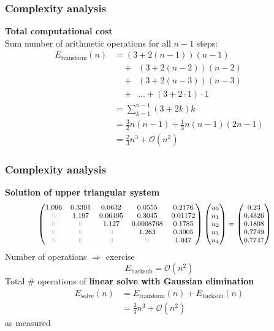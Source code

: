 \documentclass{beamer}
\begin{document}

\begin{frame}[fragile]
  \frametitle{Complexity analysis}
  \textbf{Total computational cost}\\[1ex]
  Sum number of arithmetic operations for all $n-1$ steps:
$$
\begin{aligned}
E_{\text{transform}}(n) &= (3+2(n-1))(n-1)\\
&\quad+\;\; (3+2(n-2))(n-2)\\
&\quad+\;\; (3+2(n-3))(n-3)\\
&\quad+\;\; \dots +(3+2\cdot 1)\cdot 1\\
&= \sum_{k=1}^{n-1} (3+2k)k\\
&= \frac{3}{2} n(n-1) + \frac{1}{3} n(n-1)(2n-1)\\
&= \frac{2}{3} n^3 + \mathcal{O}(n^2)
\end{aligned}
$$
\end{frame}


\begin{frame}[fragile]
  \frametitle{Complexity analysis}
  \textbf{Solution of upper triangular system}
  $$
  {\footnotesize
\begin{aligned}
\begin{pmatrix}
1.096 & 0.3391 & 0.0632 & 0.0555 & 0.2176\\
\textcolor{lightgray}{0} & 1.197 & 0.06495 & 0.3045 & 0.01172\\
\textcolor{lightgray}{0} & \textcolor{lightgray}{0} & 1.127 & 0.0008768 & 0.1785\\
\textcolor{lightgray}{0} & \textcolor{lightgray}{0} & \textcolor{lightgray}{0} & 1.263 & 0.3005\\
\textcolor{lightgray}{0} & \textcolor{lightgray}{0} & \textcolor{lightgray}{0} & \textcolor{lightgray}{0} & 1.047
\end{pmatrix}
\begin{pmatrix}
u_0 \\ u_1 \\ u_2 \\ u_3 \\ u_4
\end{pmatrix}
&=
\begin{pmatrix}
0.23\\
0.4326\\
0.1808\\
0.7749\\
0.7747
\end{pmatrix}
\end{aligned}}
$$
Number of operations $\Rightarrow$ exercise
$$
E_{\text{backsub}}=\mathcal{O}(n^2)
$$
Total \# operations of \textbf{linear solve with Gaussian elimination}
$$
\begin{aligned}
E_{\text{solve}}(n) &= E_{\text{transform}}(n) + E_{\text{backsub}}(n)\\
&= \frac{2}{3} n^3 + \mathcal{O}(n^2)
\end{aligned}
$$
as measured
\end{frame}
\end{document}
